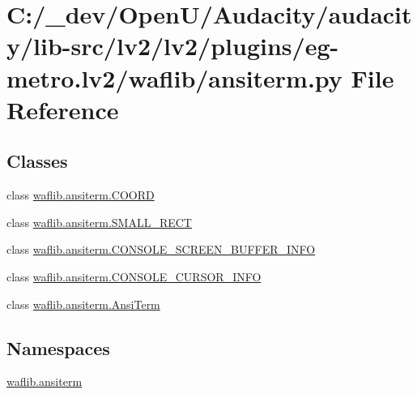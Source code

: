 \hypertarget{lv2_2plugins_2eg-metro_8lv2_2waflib_2ansiterm_8py}{}\section{C\+:/\+\_\+dev/\+Open\+U/\+Audacity/audacity/lib-\/src/lv2/lv2/plugins/eg-\/metro.lv2/waflib/ansiterm.py File Reference}
\label{lv2_2plugins_2eg-metro_8lv2_2waflib_2ansiterm_8py}
\subsection*{Classes}
\begin{DoxyCompactItemize}
\item 
class \hyperlink{classwaflib_1_1ansiterm_1_1_c_o_o_r_d}{waflib.\+ansiterm.\+C\+O\+O\+RD}
\item 
class \hyperlink{classwaflib_1_1ansiterm_1_1_s_m_a_l_l___r_e_c_t}{waflib.\+ansiterm.\+S\+M\+A\+L\+L\+\_\+\+R\+E\+CT}
\item 
class \hyperlink{classwaflib_1_1ansiterm_1_1_c_o_n_s_o_l_e___s_c_r_e_e_n___b_u_f_f_e_r___i_n_f_o}{waflib.\+ansiterm.\+C\+O\+N\+S\+O\+L\+E\+\_\+\+S\+C\+R\+E\+E\+N\+\_\+\+B\+U\+F\+F\+E\+R\+\_\+\+I\+N\+FO}
\item 
class \hyperlink{classwaflib_1_1ansiterm_1_1_c_o_n_s_o_l_e___c_u_r_s_o_r___i_n_f_o}{waflib.\+ansiterm.\+C\+O\+N\+S\+O\+L\+E\+\_\+\+C\+U\+R\+S\+O\+R\+\_\+\+I\+N\+FO}
\item 
class \hyperlink{classwaflib_1_1ansiterm_1_1_ansi_term}{waflib.\+ansiterm.\+Ansi\+Term}
\end{DoxyCompactItemize}
\subsection*{Namespaces}
\begin{DoxyCompactItemize}
\item 
 \hyperlink{namespacewaflib_1_1ansiterm}{waflib.\+ansiterm}
\end{DoxyCompactItemize}
